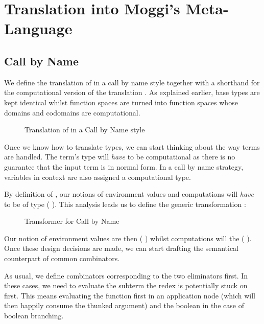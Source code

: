 \section{Translation into Moggi's Meta-Language}

\subsection{Call by Name}

We define the translation  of  in a call by name style together
with a shorthand for the computational version of the translation . As
explained earlier, base types are kept identical whilst function spaces are turned
into function spaces whose domains and codomains are computational.

\begin{figure}[h]
\caption{Translation of  in a Call by Name style\label{fig:moggicbn}}
\end{figure}

Once we know how to translate types, we can start thinking about the way terms are
handled. The term's type will \emph{have} to be computational as there is no guarantee
that the input term is in normal form. In a call by name strategy, variables in context
are also assigned a computational type.

By definition of , our notions of environment values and computations
will \emph{have} to be of type ( ). This analysis leads us to
define the generic transformation :

\begin{figure}[h]
\caption{ Transformer for Call by Name\label{fig:cbntransformer}}
\end{figure}

Our notion of environment values are then ( )
whilst computations will the ( ). Once these
design decisions are made, we can start drafting the semantical counterpart of
common combinators.

As usual, we define combinators corresponding to the two eliminators first.
In these cases, we need to evaluate the subterm the redex is potentially
stuck on first. This means evaluating the function first in an application
node (which will then happily consume the thunked argument) and the boolean
in the case of boolean branching.

